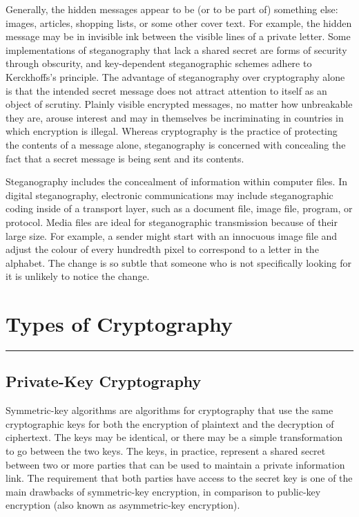 \documentclass[british]{article}
\begin{document}
Generally, the hidden messages appear to be (or to be part of) something
else: images, articles, shopping lists, or some other cover text.
For example, the hidden message may be in invisible ink between the
visible lines of a private letter. Some implementations of steganography
that lack a shared secret are forms of security through obscurity,
and key-dependent steganographic schemes adhere to Kerckhoffs's principle.
The advantage of steganography over cryptography alone is that the
intended secret message does not attract attention to itself as an
object of scrutiny. Plainly visible encrypted messages, no matter
how unbreakable they are, arouse interest and may in themselves be
incriminating in countries in which encryption is illegal. Whereas
cryptography is the practice of protecting the contents of a message
alone, steganography is concerned with concealing the fact that a
secret message is being sent and its contents.

Steganography includes the concealment of information within computer
files. In digital steganography, electronic communications may include
steganographic coding inside of a transport layer, such as a document
file, image file, program, or protocol. Media files are ideal for
steganographic transmission because of their large size. For example,
a sender might start with an innocuous image file and adjust the colour
of every hundredth pixel to correspond to a letter in the alphabet.
The change is so subtle that someone who is not specifically looking
for it is unlikely to notice the change.

\vfill{}

\pagebreak{}

\section{Types of Cryptography}
\begin{center}
\rule[0.5ex]{450bp}{0.75pt} 
\par\end{center}

\subsection{Private-Key Cryptography}

Symmetric-key algorithms are algorithms for cryptography that use
the same cryptographic keys for both the encryption of plaintext and
the decryption of ciphertext. The keys may be identical, or there
may be a simple transformation to go between the two keys. The keys,
in practice, represent a shared secret between two or more parties
that can be used to maintain a private information link. The requirement
that both parties have access to the secret key is one of the main
drawbacks of symmetric-key encryption, in comparison to public-key
encryption (also known as asymmetric-key encryption).
\end{document}
